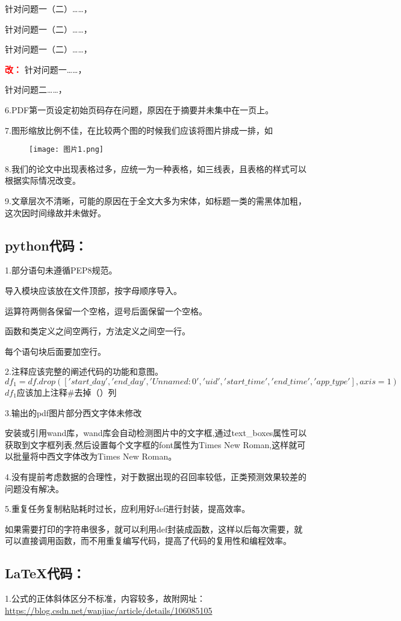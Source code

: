 \documentclass{MathModeling}
\begin{document}
	针对问题一（二）……，

	针对问题一（二）……，

	针对问题一（二）……，
	
	\textbf{\textcolor{red}{改：}}
	针对问题一……，

	针对问题二……，
	
	6.PDF第一页设定初始页码存在问题，原因在于摘要并未集中在一页上。

	7.图形缩放比例不佳，在比较两个图的时候我们应该将图片排成一排，如
	\begin{figure}[H]
		\centerline{\texttt{[image: 图片1.png]}}
	\end{figure}

	8.我们的论文中出现表格过多，应统一为一种表格，如三线表，且表格的样式可以根据实际情况改变。

	9.文章层次不清晰，可能的原因在于全文大多为宋体，如标题一类的需黑体加粗，这次因时间缘故并未做好。

	\subsection{python代码：}
	1.部分语句未遵循PEP8规范。

	导入模块应该放在文件顶部，按字母顺序导入。

	运算符两侧各保留一个空格，逗号后面保留一个空格。

	函数和类定义之间空两行，方法定义之间空一行。

	每个语句块后面要加空行。
	
	2.注释应该完整的阐述代码的功能和意图。
	$$
	{df_1}=df.drop\left(\left['start\_day', 'end\_day', 'Unnamed:0','uid', 'start\_time', 'end\_time', 'app\_type'\right],axis=1\right)
	$$
	$df_1$应该加上注释\#去掉（）列
	
	3.输出的pdf图片部分西文字体未修改
	
	安装或引用wand库，wand库会自动检测图片中的文字框,通过text\_boxes属性可以获取到文字框列表,然后设置每个文字框的font属性为Times New Roman,这样就可以批量将中西文字体改为Times New Roman。
	
	4.没有提前考虑数据的合理性，对于数据出现的召回率较低，正类预测效果较差的问题没有解决。
	
	5.重复任务复制粘贴耗时过长，应利用好def进行封装，提高效率。

	如果需要打印的字符串很多，就可以利用def封装成函数，这样以后每次需要，就可以直接调用函数，而不用重复编写代码，提高了代码的复用性和编程效率。
	
	\subsection{LaTeX代码：}
	1.公式的正体斜体区分不标准，内容较多，故附网址：\href{https://blog.csdn.net/wanjiac/article/details/106085105}{https://blog.csdn.net/wanjiac/article/details/106085105}
\end{document}
